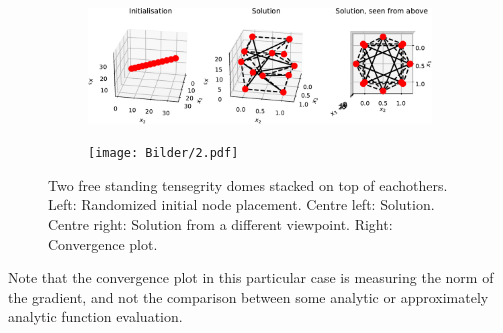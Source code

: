 \begin{figure}[!ht]
\centering
\begin{subfigure}{.72\textwidth}
  \centering
  \includegraphics[width=0.99\linewidth]{Bilder/2freestanding.pdf}
\end{subfigure}%
\begin{subfigure}{.3\textwidth}
  \centering
  \texttt{[image: Bilder/2.pdf]}
\end{subfigure}
\caption{Two free standing tensegrity domes stacked on top of eachothers. Left: Randomized initial node placement. Centre left: Solution. Centre right: Solution from a different viewpoint. Right: Convergence plot.}
\label{2free}
\end{figure}

Note that the convergence plot in this particular case is measuring the norm of the gradient, and not the comparison between some analytic or approximately analytic function evaluation.
